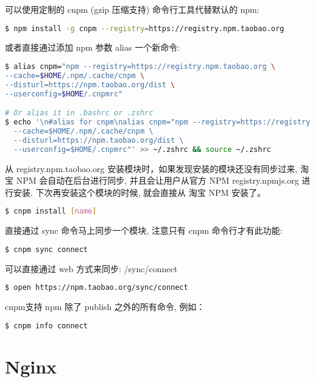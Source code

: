 可以使用定制的 cnpm (gzip 压缩支持) 命令行工具代替默认的 npm:

\begin{lstlisting}[language=bash]
$ npm install -g cnpm --registry=https://registry.npm.taobao.org
\end{lstlisting}

或者直接通过添加 npm 参数 alias 一个新命令:

\begin{lstlisting}[language=bash]
$ alias cnpm="npm --registry=https://registry.npm.taobao.org \
--cache=$HOME/.npm/.cache/cnpm \
--disturl=https://npm.taobao.org/dist \
--userconfig=$HOME/.cnpmrc"

# Or alias it in .bashrc or .zshrc
$ echo '\n#alias for cnpm\nalias cnpm="npm --registry=https://registry.npm.taobao.org \
  --cache=$HOME/.npm/.cache/cnpm \
  --disturl=https://npm.taobao.org/dist \
  --userconfig=$HOME/.cnpmrc"' >> ~/.zshrc && source ~/.zshrc
\end{lstlisting}

从 registry.npm.taobao.org 安装模块时，如果发现安装的模块还没有同步过来, 淘宝 NPM 会自动在后台进行同步, 并且会让用户从官方 NPM registry.npmjs.org 进行安装. 下次再安装这个模块的时候, 就会直接从 淘宝 NPM 安装了。


\begin{lstlisting}[language=bash]
$ cnpm install [name]
\end{lstlisting}

直接通过 sync 命令马上同步一个模块, 注意只有 cnpm 命令行才有此功能:

\begin{lstlisting}[language=bash]
$ cnpm sync connect
\end{lstlisting}

可以直接通过 web 方式来同步: /sync/connect

\begin{lstlisting}[language=bash]
$ open https://npm.taobao.org/sync/connect
\end{lstlisting}


cnpm支持 npm 除了 publish 之外的所有命令, 例如：

\begin{lstlisting}[language=bash]
$ cnpm info connect
\end{lstlisting}


\section{Nginx}




